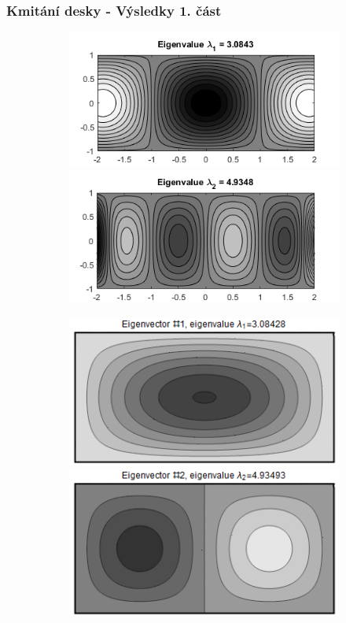 \documentclass[xcolor=table]{beamer}
\begin{document}
\begin{frame}
\frametitle{Kmitání desky - Výsledky 1. část}

\begin{figure}
\centering
\begin{subfigure}{.5\textwidth}
\centering
\includegraphics[width=1\linewidth]{obdelnicky11.png}
\includegraphics[width=1\linewidth]{obdelnicky12.png}
\end{subfigure}%
\begin{subfigure}{.5\textwidth}
\centering
\includegraphics[width=.95\linewidth]{rectangle-eigenvector-1.png}
\includegraphics[width=.95\linewidth]{rectangle-eigenvector-2.png}

\end{subfigure}
\end{figure}
\end{frame}
\end{document}
